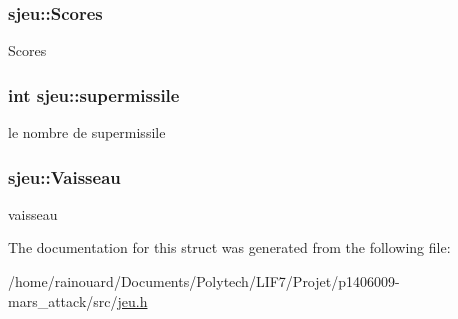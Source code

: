 \subsubsection[{\texorpdfstring{Scores}{Scores}}]{ sjeu\+::\+Scores}\hypertarget{structsjeu_a7c9cb778d1b512ae940ab378f14a1942}{}\label{structsjeu_a7c9cb778d1b512ae940ab378f14a1942}
Scores 
\subsubsection[{\texorpdfstring{supermissile}{supermissile}}]{\setlength{\rightskip}{0pt plus 5cm}int sjeu\+::supermissile}\hypertarget{structsjeu_a2fe3935f24c9e3e1de88864b06141950}{}\label{structsjeu_a2fe3935f24c9e3e1de88864b06141950}
le nombre de supermissile 
\subsubsection[{\texorpdfstring{Vaisseau}{Vaisseau}}]{ sjeu\+::\+Vaisseau}\hypertarget{structsjeu_af17c0c22c50196e3aec2f1d243a4c900}{}\label{structsjeu_af17c0c22c50196e3aec2f1d243a4c900}
vaisseau 

The documentation for this struct was generated from the following file\+:\begin{DoxyCompactItemize}
\item 
/home/rainouard/\+Documents/\+Polytech/\+L\+I\+F7/\+Projet/p1406009-\/mars\+\_\+attack/src/\hyperlink{jeu_8h}{jeu.\+h}\end{DoxyCompactItemize}
